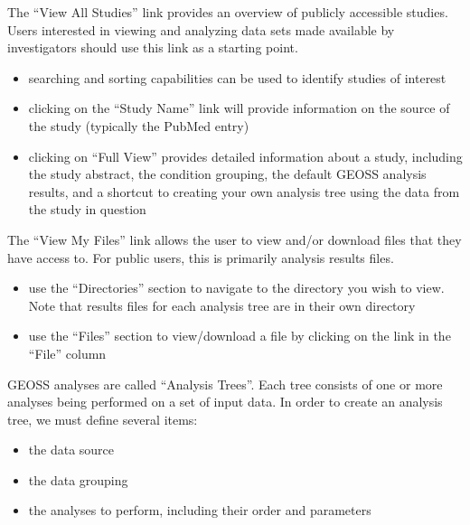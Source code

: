 \documentclass{compactslide} %
\begin{document}
\begin{slide}

The ``View All Studies'' link provides an overview of publicly
accessible studies.  Users interested in viewing and analyzing data sets
made available by investigators should use this link as a starting
point.
\begin{itemize}
\item searching and sorting capabilities can be used to identify studies of
  interest
\item clicking on the ``Study Name'' link will provide information on the
  source of the study  (typically the PubMed entry)
\item clicking on ``Full View'' provides detailed information about a study,
  including the study abstract, the condition grouping, the default
  GEOSS analysis results, and a shortcut to creating your own analysis
  tree using the data from the study in question
\end{itemize}
\end{slide}

\begin{slide}
The ``View My Files'' link allows the user to view and/or download files that
they have access to.  For public users, this is primarily analysis
results files.
\begin{itemize}
\item use the ``Directories'' section to navigate to the directory you wish to
  view.  Note that results files for each analysis tree are in their own
  directory
\item use the ``Files'' section to view/download a file by clicking on the
  link in the ``File'' column
\end{itemize}
\end{slide}

\begin{slide}

GEOSS analyses are called ``Analysis Trees''.  Each tree consists of one
or more analyses being performed on a set of input data.  In order to
create an analysis tree, we must define several items:
\begin{itemize}
\item the data source
\item the data grouping
\item the analyses to perform, including their order and parameters
\end{itemize}
\end{slide}
\end{document}
